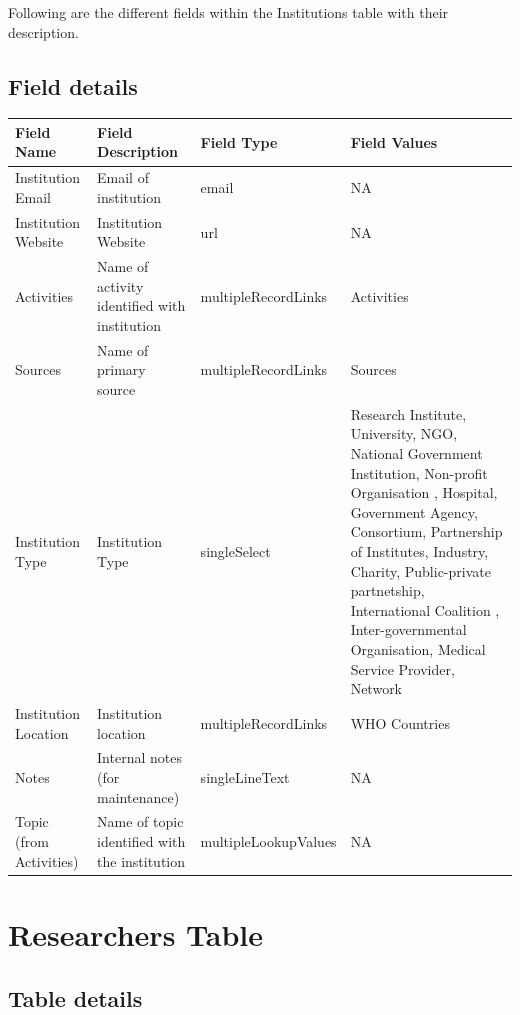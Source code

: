 \documentclass[
]{book}
\begin{document}
Following are the different fields within the Institutions table with their description.

\hypertarget{field-details-2}{%
\subsection{Field details}\label{field-details-2}}

\begin{table}
\centering
\begin{tabular}{l|l|l|l}
\hline
\textbf{Field Name} & \textbf{Field Description} & \textbf{Field Type} & \textbf{Field Values}\\
\hline
Institution Email & Email of institution & email & NA\\
\hline
Institution Website & Institution Website & url & NA\\
\hline
Activities & Name of activity identified with institution & multipleRecordLinks & Activities\\
\hline
Sources & Name of primary source & multipleRecordLinks & Sources\\
\hline
Institution Type & Institution Type & singleSelect & Research Institute, University, NGO, National Government Institution, Non-profit Organisation , Hospital, Government Agency, Consortium, Partnership of Institutes, Industry, Charity, Public-private partnetship, International Coalition , Inter-governmental Organisation, Medical Service Provider, Network\\
\hline
Institution Location & Institution location & multipleRecordLinks & WHO Countries\\
\hline
Notes & Internal notes (for maintenance) & singleLineText & NA\\
\hline
Topic (from Activities) & Name of topic identified with the institution & multipleLookupValues & NA\\
\hline
\end{tabular}
\end{table}

\hypertarget{researchers-table}{%
\section{Researchers Table}\label{researchers-table}}

\hypertarget{table-details-5}{%
\subsection{Table details}\label{table-details-5}}
\end{document}
